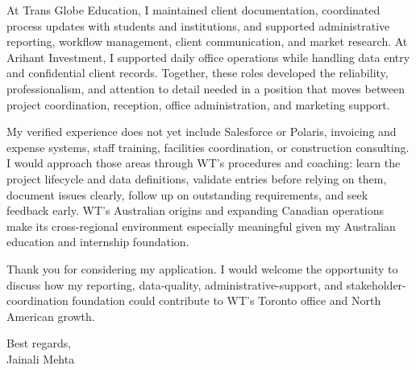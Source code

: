 \documentclass[letterpaper,11pt]{article}
\begin{document}
\bigbreak
At Trans Globe Education, I maintained client documentation, coordinated process updates with students and institutions, and supported administrative reporting, workflow management, client communication, and market research. At Arihant Investment, I supported daily office operations while handling data entry and confidential client records. Together, these roles developed the reliability, professionalism, and attention to detail needed in a position that moves between project coordination, reception, office administration, and marketing support.

\bigbreak
My verified experience does not yet include Salesforce or Polaris, invoicing and expense systems, staff training, facilities coordination, or construction consulting. I would approach those areas through WT's procedures and coaching: learn the project lifecycle and data definitions, validate entries before relying on them, document issues clearly, follow up on outstanding requirements, and seek feedback early. WT's Australian origins and expanding Canadian operations make its cross-regional environment especially meaningful given my Australian education and internship foundation.

\bigbreak
Thank you for considering my application. I would welcome the opportunity to discuss how my reporting, data-quality, administrative-support, and stakeholder-coordination foundation could contribute to WT's Toronto office and North American growth.

\bigbreak
Best regards,\\
Jainali Mehta
\end{document}
